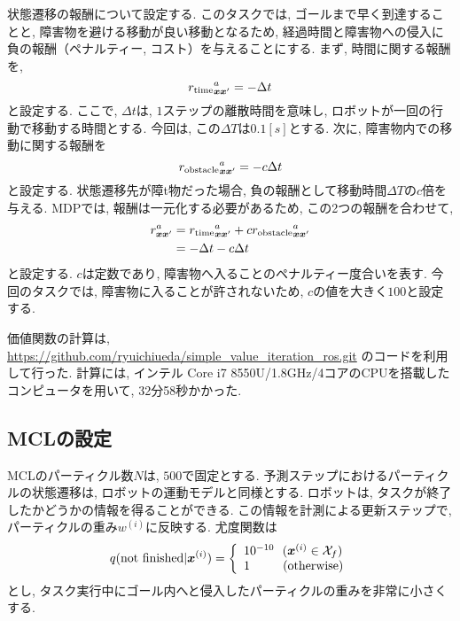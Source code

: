 状態遷移の報酬について設定する. 
このタスクでは, ゴールまで早く到達することと, 障害物を避ける移動が良い移動となるため, 
経過時間と障害物への侵入に負の報酬（ペナルティー, コスト）を与えることにする. 
まず, 時間に関する報酬を, 
\begin{equation}
\label{robot initial pose}
  {r_{\rm time}}^{a}_{\bm{x}\bm{x}^{\prime}} = -\Delta t
\end{equation}
と設定する. ここで, $\Delta t$は, $1$ステップの離散時間を意味し, ロボットが一回の行動で移動する時間とする. 
今回は, この$\Delta T$は$0.1[s]$とする. 
次に, 障害物内での移動に関する報酬を
\begin{equation}
\label{robot initial pose}
  {r_{\rm obstacle}}^{a}_{\bm{x}\bm{x}^{\prime}} = -c\Delta t
\end{equation}
と設定する. 状態遷移先が障t物だった場合, 負の報酬として移動時間$\Delta T$の$c$倍を与える. 
MDPでは, 報酬は一元化する必要があるため, この2つの報酬を合わせて, 
\begin{equation}
\label{robot initial pose}
\begin{split}
  r^{a}_{\bm{x}\bm{x}^{\prime}} &=
  {r_{\rm time}}^{a}_{\bm{x}\bm{x}^{\prime}} +
  c{r_{\rm obstacle}}^{a}_{\bm{x}\bm{x}^{\prime}} \\
  &= -\Delta t  -c\Delta t
\end{split}
\end{equation}
と設定する. 
$c$は定数であり, 障害物へ入ることのペナルティー度合いを表す. 
今回のタスクでは, 障害物に入ることが許されないため, $c$の値を大きく$100$と設定する. 

価値関数の計算は, 
\url{https://github.com/ryuichiueda/simple_value_iteration_ros.git}
のコードを利用して行った. 
計算には, インテル Core i7 8550U/1.8GHz/4コアのCPUを搭載したコンピュータを用いて, 32分58秒かかった. 

\subsection{MCLの設定}
MCLのパーティクル数$N$は, $500$で固定とする. 
予測ステップにおけるパーティクルの状態遷移は, ロボットの運動モデルと同様とする. 
ロボットは, タスクが終了したかどうかの情報を得ることができる. 
この情報を計測による更新ステップで, パーティクルの重み$w^{(i)}$に反映する. 
尤度関数は
\begin{equation}
  q({\rm not \  finished} | \bm{x}^{(i)}) =
  \left\{
    \begin{array}{l}
      10^{-10} \ \ (\bm{x}^{(i)} \in \mathcal{X}_{f}) \\
      1 \quad \quad \ \ ({\rm otherwise})
    \end{array}
  \right.
\end{equation}
とし, タスク実行中にゴール内へと侵入したパーティクルの重みを非常に小さくする. 

